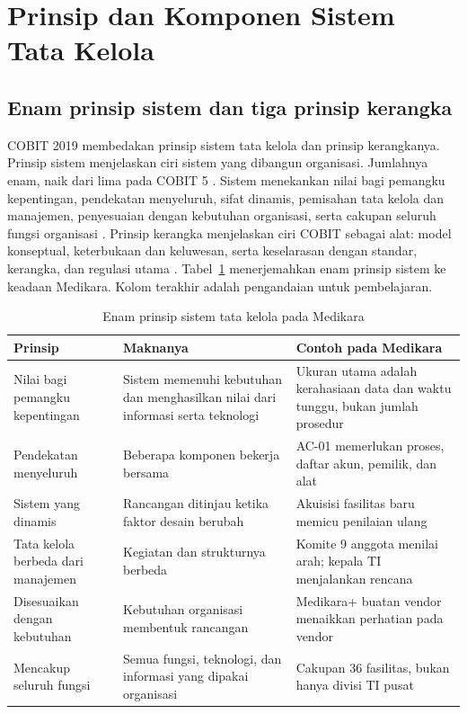 \section{Prinsip dan Komponen Sistem Tata Kelola}

\subsection*{Enam prinsip sistem dan tiga prinsip kerangka}

COBIT 2019 membedakan prinsip sistem tata kelola dan prinsip kerangkanya. Prinsip sistem menjelaskan
ciri sistem yang dibangun organisasi. Jumlahnya enam, naik dari lima pada COBIT 5
\cite{c04-perbandingan}. Sistem menekankan nilai bagi pemangku kepentingan, pendekatan menyeluruh,
sifat dinamis, pemisahan tata kelola dan manajemen, penyesuaian dengan kebutuhan organisasi, serta
cakupan seluruh fungsi organisasi \cite{c04-prinsip}. Prinsip kerangka menjelaskan ciri COBIT sebagai
alat: model konseptual, keterbukaan dan keluwesan, serta keselarasan dengan standar, kerangka, dan
regulasi utama \cite{c04-perbandingan}. Tabel~\ref{tab:ch04-prinsip} menerjemahkan enam prinsip sistem
ke keadaan Medikara. Kolom terakhir adalah pengandaian untuk pembelajaran.

\begin{table}[!htb]
  \centering\small
  \caption{Enam prinsip sistem tata kelola pada Medikara}\label{tab:ch04-prinsip}
  \begin{tabularx}{\textwidth}{|>{\raggedright\arraybackslash}p{}|>{\raggedright\arraybackslash}X|>{\raggedright\arraybackslash}X|}
    \hline
    \textbf{Prinsip} & \textbf{Maknanya} & \textbf{Contoh pada Medikara} \\ \hline
    Nilai bagi pemangku kepentingan & Sistem memenuhi kebutuhan dan menghasilkan nilai dari informasi
    serta teknologi & Ukuran utama adalah kerahasiaan data dan waktu tunggu, bukan jumlah prosedur \\ \hline
    Pendekatan menyeluruh & Beberapa komponen bekerja bersama & AC-01 memerlukan proses, daftar akun,
    pemilik, dan alat \\ \hline
    Sistem yang dinamis & Rancangan ditinjau ketika faktor desain berubah & Akuisisi fasilitas baru
    memicu penilaian ulang \\ \hline
    Tata kelola berbeda dari manajemen & Kegiatan dan strukturnya berbeda & Komite 9 anggota menilai
    arah; kepala TI menjalankan rencana \\ \hline
    Disesuaikan dengan kebutuhan & Kebutuhan organisasi membentuk rancangan & Medikara+ buatan vendor
    menaikkan perhatian pada vendor \\ \hline
    Mencakup seluruh fungsi & Semua fungsi, teknologi, dan informasi yang dipakai organisasi & Cakupan
    36 fasilitas, bukan hanya divisi TI pusat \\ \hline
  \end{tabularx}
\end{table}

